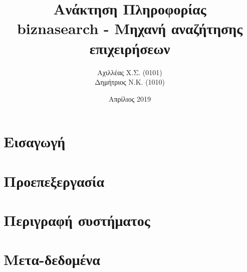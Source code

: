 \documentclass[10pt,a4paper]{article}
\title{%
  \huge \textgreek{Ανάκτηση Πληροφορίας} \\
\large biznasearch - \textgreek{Μηχανή αναζήτησης επιχειρήσεων}}
\author{
    \textgreek{Αχιλλέας Χ.Σ.} (0101) \\
    \textgreek{Δημήτριος Ν.Κ.} (1010)
}
\date{\textgreek{Απρίλιος} 2019}
\begin{document}

\maketitle
\newpage

\renewcommand{\contentsname}{\textgreek{Περιεχόμενα}}
\tableofcontents


\newpage
\section{\textgreek{Εισαγωγή}}


\newpage
\section{\textgreek{Προεπεξεργασία}}


\newpage
\section{\textgreek{Περιγραφή συστήματος}}


\newpage
\section{\textgreek{Μετα-δεδομένα}}


\newpage
\end{document}
